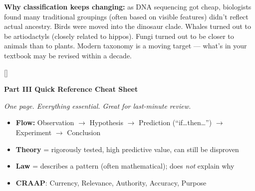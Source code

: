 \documentclass[11pt, letterpaper]{article}
\newcommand{\purplesections}{%
  \titleformat{\section}{\large\bfseries\color{sectionpurple}}{}{0em}{}[\color{sectionpurple}\titlerule]%
  \titleformat{\subsection}{\normalsize\bfseries\color{sectionpurple!80!black}}{}{0em}{}%
}
\newcommand{\partbanner}[3]{%
  \begin{tcolorbox}[colback=#1, colframe=#2, boxrule=1.2pt, arc=4pt,
    left=8pt, right=8pt, top=6pt, bottom=6pt]
    \begin{center}{\LARGE\bfseries #3}\end{center}
  \end{tcolorbox}%
}
\begin{document}
\textbf{Why classification keeps changing:} as DNA sequencing got cheap, biologists found
many traditional groupings (often based on visible features) didn't reflect actual ancestry.
Birds were moved into the dinosaur clade. Whales turned out to be artiodactyls (closely
related to hippos). Fungi turned out to be closer to animals than to plants. Modern taxonomy
is a moving target --- what's in your textbook may be revised within a decade.


\newpage

\purplesections
{}
\partbanner{part3bg}{sectionpurple}{Part III \quad Quick Reference Cheat Sheet}

\vspace{4pt}
\begin{center}\small\itshape One page. Everything essential. Great for last-minute review.\end{center}
\vspace{4pt}

\begin{tcolorbox}[colback=part2bg, colframe=sectiongreen,
  title={\bfseries Scientific Method}, arc=3pt, boxrule=1pt]
\begin{itemize}[noitemsep, leftmargin=*]
  \item \textbf{Flow:} Observation $\to$ Hypothesis $\to$ Prediction (``if\ldots then\ldots'') $\to$ Experiment $\to$ Conclusion
  \item \textbf{Theory} = rigorously tested, high predictive value, can still be disproven
  \item \textbf{Law} = describes a pattern (often mathematical); does \emph{not} explain why
  \item \textbf{CRAAP}: Currency, Relevance, Authority, Accuracy, Purpose
\end{itemize}
\end{tcolorbox}
\end{document}
